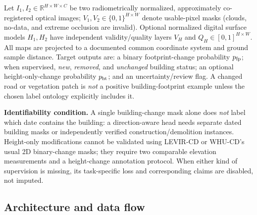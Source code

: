 \documentclass[11pt,a4paper]{article}
\begin{document}
Let $I_1,I_2\in\mathbb{R}^{H\times W\times C}$ be two radiometrically normalized, approximately co-registered optical images; $V_1,V_2\in\{0,1\}^{H\times W}$ denote usable-pixel masks (clouds, no-data, and extreme occlusion are invalid). Optional normalized digital surface models $H_1,H_2$ have independent validity/quality layers $V_H$ and $Q_H\in[0,1]^{H\times W}$. All maps are projected to a documented common coordinate system and ground sample distance. Target outputs are: a binary footprint-change probability $p_{\rm fp}$; when supervised, \emph{new}, \emph{removed}, and \emph{unchanged} building status; an optional height-only-change probability $p_{\rm ht}$; and an uncertainty/review flag. A changed road or vegetation patch is \emph{not} a positive building-footprint example unless the chosen label ontology explicitly includes it.

\textbf{Identifiability condition.} A single building-change mask alone does \emph{not} label which date contains the building: a direction-aware head needs separate dated building masks or independently verified construction/demolition instances. Height-only modifications cannot be validated using LEVIR-CD or WHU-CD's usual 2D binary-change masks; they require two comparable elevation measurements and a height-change annotation protocol. When either kind of supervision is missing, its task-specific loss and corresponding claims are disabled, not imputed.

\subsection{Architecture and data flow}
\end{document}
